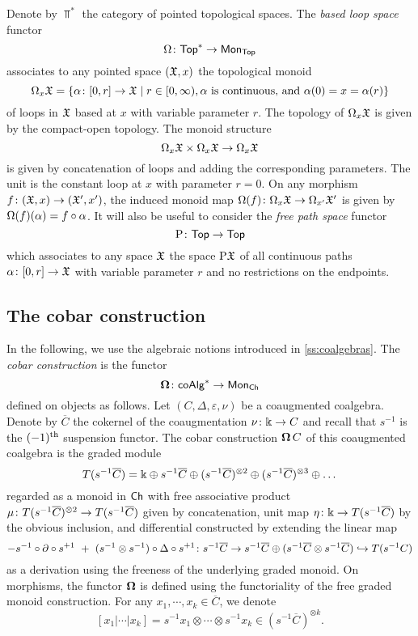 Denote by $\Top^\ast$ the category of pointed topological spaces. The \textit{based loop space} functor
\[ \Omega \colon \mathsf{Top}^\ast \to \mathsf{Mon}_{\mathsf{Top}}\]
associates to any pointed space $(\mathfrak{X},x)$ the topological monoid
\[\Omega_x \mathfrak{X}= \{ \alpha \colon [0,r] \to \mathfrak{X} \mid r \in [0, \infty), \text{$\alpha$ is continuous, and } \alpha(0)=x=\alpha(r)\}
\]
of loops in $\mathfrak{X}$ based at $x$ with variable parameter $r$. The topology of $\Omega_x \mathfrak{X}$ is given by the compact-open topology. The monoid structure \[\Omega_x \mathfrak{X} \times \Omega_x \mathfrak{X} \to \Omega_x \mathfrak{X}\] is given by concatenation of loops and adding the corresponding parameters. The unit is the constant loop at $x$ with parameter $r=0$. On any morphism $f \colon (\mathfrak{X},x) \to (\mathfrak{X}',x')$, the induced monoid map $\Omega (f) \colon \Omega_x \mathfrak{X} \to \Omega_{x'} \mathfrak{X}'$ is given by $\Omega(f) (\alpha) = f\circ\alpha$. It will also be useful to consider the \textit{free path space} functor
\[
\mathrm{P} \colon \mathsf{Top} \to \mathsf{Top}
\]
which associates to any space $\mathfrak{X}$ the space $\mathrm{P}\mathfrak{X}$ of all continuous paths $\alpha \colon [0,r] \to \mathfrak{X}$ with variable parameter $r$ and no restrictions on the endpoints.
\subsection{The cobar construction}\label{ss:cobar construction}
In the following, we use the algebraic notions introduced in \cref{ss:coalgebras}. The \textit{cobar construction} is the functor
\[
\operatorname{\mathbf{\Omega}} \colon \mathsf{coAlg}^\ast \to \mathsf{Mon}_{\mathsf{Ch}}
\]
defined on objects as follows.
Let $(C, \Delta, \varepsilon, \nu)$ be a coaugmented coalgebra.
Denote by $\overline{C}$ the cokernel of the coaugmentation $\nu \colon \Bbbk \to C$ and recall that $s^{-1}$ is the $(-1)^{\mathrm{th}}$ suspension functor.
The cobar construction $\operatorname{\mathbf{\Omega}} C$ of this coaugmented coalgebra is the graded module
\[
T(s^{-1} \overline{C}) = \Bbbk \oplus s^{-1}\overline{C} \oplus (s^{-1}\overline{C})^{\otimes 2} \oplus (s^{-1}\overline{C})^{\otimes 3} \oplus \dots
\]
regarded as a monoid in $\mathsf{Ch}$ with free associative product $\mu \colon T(s^{-1} \overline{C})^{\otimes 2} \to T(s^{-1} \overline{C})$ given by concatenation, unit map $\eta \colon \Bbbk \to T(s^{-1} \overline{C})$ by the obvious inclusion, and differential constructed by extending the linear map
\[
- s^{-1} \circ \partial \circ s^{+1} \ + \ (s^{-1} \otimes s^{-1}) \circ \Delta \circ s^{+1} \colon
s^{-1} \overline{C} \to s^{-1}\overline{C} \oplus (s^{-1}\overline{C} \otimes s^{-1}\overline{C}) \hookrightarrow T(s^{-1}C)
\]
as a derivation using the freeness of the underlying graded monoid. On morphisms, the functor $\operatorname{\mathbf{\Omega}}$ is defined using the functoriality of the free graded monoid construction. For any $x_1, \cdots, x_k \in \overline{C}$, we denote
\[
[x_1| \cdots | x_k]= s^{-1} x_1 \otimes \cdots \otimes s^{-1}x_k \in (s^{-1}\overline{C})^{\otimes k}.
\]

